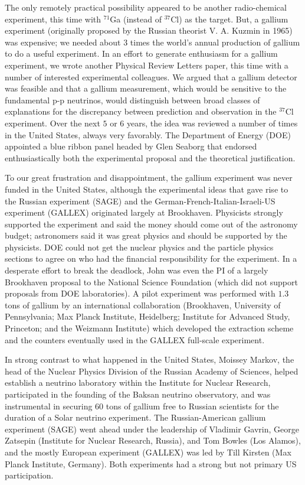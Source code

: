\documentclass[a4paper,10pt]{article}
\begin{document}
{\noindent}The only remotely practical possibility appeared to be another radio-chemical experiment, this time with $^{71}$Ga (instead of $^{37}$Cl) as the target. But, a gallium experiment (originally proposed by the Russian theorist V. A. Kuzmin in 1965) was expensive; we needed about 3 times the world's annual production of gallium to do a useful experiment. In an effort to generate enthusiasm for a gallium experiment, we wrote another Physical Review Letters paper, this time with a number of interested experimental colleagues. We argued that a gallium detector was feasible and that a gallium measurement, which would be sensitive to the fundamental p-p neutrinos, would distinguish between broad classes of explanations for the discrepancy between prediction and observation in the $^{37}$Cl experiment. Over the next $5$ or $6$ years, the idea was reviewed a number of times in the United States, always very favorably. The Department of Energy (DOE) appointed a blue ribbon panel headed by Glen Seaborg that endorsed enthusiastically both the experimental proposal and the theoretical justification.

{\noindent}To our great frustration and disappointment, the gallium experiment was never funded in the United States, although the experimental ideas that gave rise to the Russian experiment (SAGE) and the German-French-Italian-Israeli-US experiment (GALLEX) originated largely at Brookhaven. Physicists strongly supported the experiment and said the money should come out of the astronomy budget; astronomers said it was great physics and should be supported by the physicists. DOE could not get the nuclear physics and the particle physics sections to agree on who had the financial responsibility for the experiment. In a desperate effort to break the deadlock, John was even the PI of a largely Brookhaven proposal to the National Science Foundation (which did not support proposals from DOE laboratories). A pilot experiment was performed with $1.3$ tons of gallium by an international collaboration (Brookhaven, University of Pennsylvania; Max Planck Institute, Heidelberg; Institute for Advanced Study, Princeton; and the Weizmann Institute) which developed the extraction scheme and the counters eventually used in the GALLEX full-scale experiment.

{\noindent}In strong contrast to what happened in the United States, Moissey Markov, the head of the Nuclear Physics Division of the Russian Academy of Sciences, helped establish a neutrino laboratory within the Institute for Nuclear Research, participated in the founding of the Baksan neutrino observatory, and was instrumental in securing $60$ tons of gallium free to Russian scientists for the duration of a Solar neutrino experiment. The Russian-American gallium experiment (SAGE) went ahead under the leadership of Vladimir Gavrin, George Zatsepin (Institute for Nuclear Research, Russia), and Tom Bowles (Los Alamos), and the mostly European experiment (GALLEX) was led by Till Kirsten (Max Planck Institute, Germany). Both experiments had a strong but not primary US participation.
\end{document}
